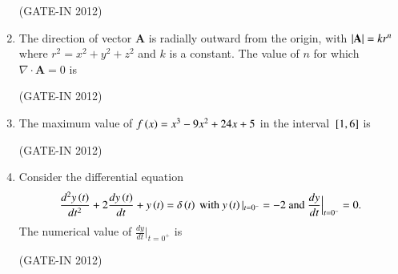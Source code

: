 \documentclass[journal,12pt,onecolumn]{IEEEtran}
\theoremstyle{remark}
\begin{document}
\begin{enumerate}
\hfill{(GATE-IN 2012)}
\begin{enumerate}
\end{enumerate}

\item The direction of vector $\mathbf{A}$ is radially outward from the origin, with
$\left\vert\mathbf{A}\right\vert = kr^n$ where $r^2 = x^2+y^2+z^2$ and $k$ is a constant. The value of $n$ for which $\nabla \cdot \mathbf{A}=0$ is

\hfill{(GATE-IN 2012)}
\begin{enumerate}
\end{enumerate}

\item The maximum value of $f\left(x\right) = x^3 - 9x^2 + 24x + 5$ in the interval ${}\left[1, 6\right]$ is

\hfill{(GATE-IN 2012)}
\begin{enumerate}
\end{enumerate}

\item Consider the differential equation
\begin{align*}
\frac{d^2y\left(t\right)}{dt^2} + 2\frac{dy\left(t\right)}{dt} + y\left(t\right) = \delta\left(t\right) \text{ with } y\left(t\right)|_{t=0^-} = -2 \text{ and }\frac{dy}{dt}\Big|_{t=0^-} = 0.
\end{align*}
The numerical value of $\frac{dy}{dt}\Big|_{t=0^+}$ is

\hfill{(GATE-IN 2012)}
\begin{enumerate}
\end{enumerate}


\end{enumerate}
\end{document}
